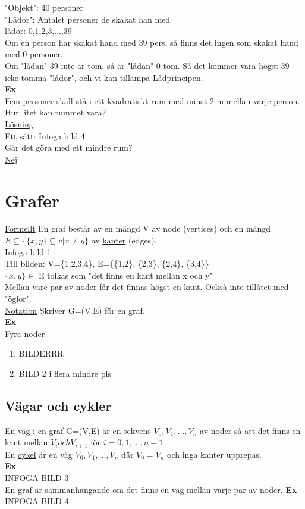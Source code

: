 \documentclass{article}
\begin{document}
    "Objekt": 40 personer\\
    "Lådor": Antalet personer de skakat han med\\
    lådor: 0,1,2,3,...,39\\
    Om en person har skakat hand med 39 pers, så finns det ingen som skakat hand med 0 personer.\\
    Om "lådan" 39 inte är tom, så är "lådan" 0 tom. 
    Så det kommer vara högst 39 icke-tomma "lådor", och vi \underline{kan} tillämpa Lådprincipen.\\
    \underline{\textbf{Ex}}\\
    Fem personer skall stå i ett kvadratiskt rum med minst 2 m mellan varje person.
    Hur litet kan rummet vara?\\
    \underline{Lösning}\\
    Ett sätt: Infoga bild 4\\
    Går det göra med ett mindre rum?\\
    \underline{Nej}
    \clearpage 
    \section{Grafer}
    \underline{Formellt} En graf består av en mängd V av node (vertices) och en mängd $E\subseteq \{\{x,y\}\subseteq v | x\neq y\}$ av \underline{kanter} (edges).\\
    Infoga bild 1\\
    Till bilden: V=\{1,2,3,4\}, E=\{\{1,2\}, \{2,3\}, \{2,4\}, \{3,4\}\}\\
    $\{x,y\}\in$ E tolkas som "det finns en kant mellan x och y"\\
    Mellan vare par av noder får det finnas \underline{högst} en kant. Också inte tillåtet med "öglor".\\
    \underline{Notation} Skriver G=(V,E) för en graf.\\
    \underline{\textbf{Ex}}\\
    Fyra noder
    \begin{enumerate}
        \item BILDERRR
        \item BILD 2 i flera mindre pls
    \end{enumerate}
    \subsection{Vägar och cykler}
    En \underline{väg} i en graf G=(V,E) är en sekvens $V_{0}, V_{1}, ..., V_{n}$ av noder så att det finns en kant mellan $V_{i} och V_{i+1}$ för $i=0, 1, ..., n-1$\\
    En \underline{cykel} är en väg $V_{0}, V_{1}, ..., V_{n}$ där $V_{0}=V_{n}$ och inga kanter upprepas.\\
    \underline{\textbf{Ex}}\\
    INFOGA BILD 3\\
    En graf är \underline{sammanhängande} om det finns en väg mellan varje par av noder.
    \underline{\textbf{Ex}}\\
    INFOGA BILD 4\\
\end{document}
